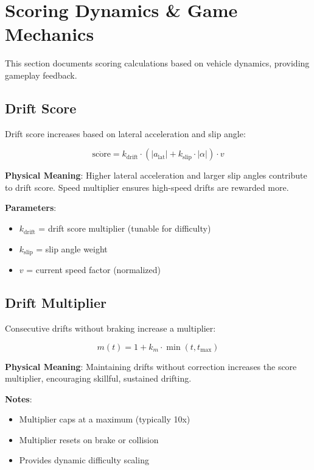 \section{Scoring Dynamics \& Game Mechanics}

This section documents scoring calculations based on vehicle dynamics, providing gameplay feedback.

\subsection{Drift Score}

Drift score increases based on lateral acceleration and slip angle:

\begin{equation}
  \dot{\text{score}} = k_{\text{drift}} \cdot (|a_{\text{lat}}| + k_{\text{slip}} \cdot |\alpha|) \cdot v
  \label{eq:drift-score-rate}
\end{equation}

\textbf{Physical Meaning}: Higher lateral acceleration and larger slip angles contribute to drift score. Speed multiplier ensures high-speed drifts are rewarded more.

\textbf{Parameters}:
\begin{itemize}
  \item $k_{\text{drift}}$ = drift score multiplier (tunable for difficulty)
  \item $k_{\text{slip}}$ = slip angle weight
  \item $v$ = current speed factor (normalized)
\end{itemize}

\subsection{Drift Multiplier}

Consecutive drifts without braking increase a multiplier:

\begin{equation}
  m(t) = 1 + k_m \cdot \min(t, t_{\text{max}})
  \label{eq:drift-multiplier}
\end{equation}

\textbf{Physical Meaning}: Maintaining drifts without correction increases the score multiplier, encouraging skillful, sustained drifting.

\textbf{Notes}:
\begin{itemize}
  \item Multiplier caps at a maximum (typically 10x)
  \item Multiplier resets on brake or collision
  \item Provides dynamic difficulty scaling
\end{itemize}

\newpage
